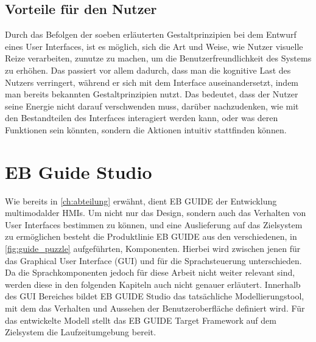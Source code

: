 \subsection*{Vorteile für den Nutzer}
Durch das Befolgen der soeben erläuterten Gestaltprinzipien bei dem Entwurf eines User Interfaces, ist es möglich, sich die Art und Weise, wie Nutzer visuelle Reize verarbeiten, zunutze zu machen, um die Benutzerfreundlichkeit des Systems zu erhöhen.
Das passiert vor allem dadurch, dass man die kognitive Last des Nutzers verringert, während er sich mit dem Interface auseinandersetzt, indem man bereits bekannten Gestaltprinzipien nutzt.
Das bedeutet, dass der Nutzer seine Energie nicht darauf verschwenden muss, darüber nachzudenken, wie mit den Bestandteilen des Interfaces interagiert werden kann, oder was deren Funktionen sein könnten, sondern die Aktionen intuitiv stattfinden können\cite{Knight.2019c}.

\section{EB Guide Studio}
\label{ch:guide}
Wie bereits in \cref{ch:abteilung} erwähnt, dient EB GUIDE der Entwicklung multimodalder HMIs.
Um nicht nur das Design, sondern auch das Verhalten von User Interfaces bestimmen zu können, und eine Auslieferung auf das Zielsystem zu ermöglichen besteht die Produktlinie EB GUIDE aus den verschiedenen, in \cref{fig:guide_puzzle} aufgeführten, Komponenten.
Hierbei wird zwischen jenen für das Graphical User Interface (GUI) und  für die Sprachsteuerung unterschieden.
Da die Sprachkomponenten jedoch für diese Arbeit nicht weiter relevant sind, werden diese in den folgenden Kapiteln auch nicht genauer erläutert.
Innerhalb des GUI Bereiches bildet EB GUIDE Studio das tatsächliche Modellierungstool, mit dem das Verhalten und Aussehen der Benutzeroberfläche definiert wird.
Für das entwickelte Modell stellt das EB GUIDE Target Framework auf dem Zielsystem die Laufzeitumgebung bereit.\cite{.c}

